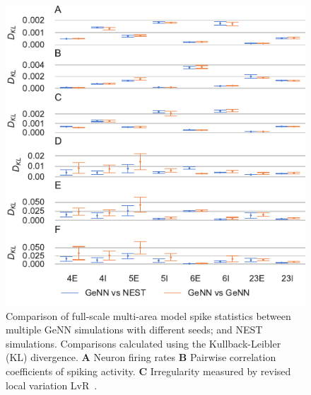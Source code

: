 \documentclass[9pt,a4paper]{amsart}
\begin{document}
\begin{figure}
    \centering
    \includegraphics{figures/microcircuit_accuracy_kl}
    \caption{Comparison of full-scale multi-area model spike statistics between multiple GeNN simulations with different seeds; and NEST simulations.
    Comparisons calculated using the Kullback-Leibler (KL) divergence.
    \textbf{A} Neuron firing rates
    \textbf{B} Pairwise correlation coefficients of spiking activity.
    \textbf{C} Irregularity measured by revised local variation LvR~\citep{Shinomoto2009}.}
    \label{fig:microcircuit_accuracy_kl}
\end{figure}
%
\end{document}
